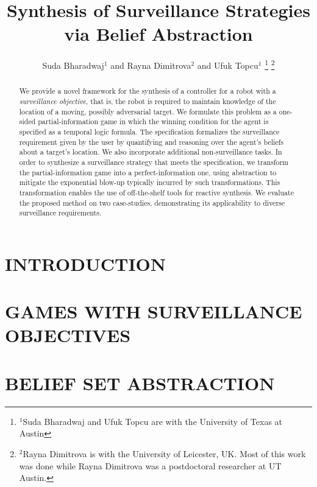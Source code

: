 \documentclass[letterpaper, 10 pt, conference]{ieeeconf}  %
\title{\LARGE \bf Synthesis of Surveillance Strategies via Belief Abstraction}
\author{Suda Bharadwaj$^{1}$ and Rayna Dimitrova$^{2}$ and Ufuk Topcu$^{1}$%
\thanks{$^{1}$Suda Bharadwaj and Ufuk Topcu are with the University of Texas at Austin}%
\thanks{$^{2}$Rayna Dimitrova is with the University of Leicester, UK. Most of this work was done while Rayna Dimitrova was a postdoctoral researcher at UT Austin.}%
}
\begin{document}
\maketitle
\thispagestyle{empty}
\pagestyle{empty}


\begin{abstract}

We provide a novel framework for the synthesis of a controller for a robot with a \emph{surveillance objective}, that is, the robot is required to  maintain knowledge of the location of a moving, possibly adversarial target. We formulate this problem as a one-sided partial-information  game in which the winning condition for the agent is specified as a temporal logic formula. The specification formalizes the surveillance requirement given by the user by quantifying and reasoning over the agent's beliefs about a target's location. We also incorporate additional non-surveillance tasks. In order to synthesize a surveillance strategy that meets the specification, we transform the partial-information game into a perfect-information one, using abstraction to mitigate the exponential blow-up typically incurred by such transformations. This transformation enables the use of off-the-shelf tools for reactive synthesis. We evaluate the proposed method on two case-studies, demonstrating its applicability to diverse surveillance requirements.
\end{abstract}


\section{INTRODUCTION}




\section{GAMES WITH SURVEILLANCE OBJECTIVES}



\section{BELIEF SET ABSTRACTION}

\end{document}

